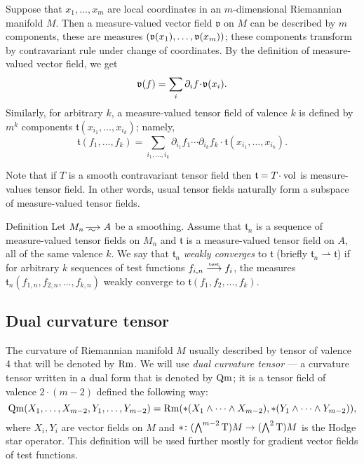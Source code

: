 Suppose that $x_1,\dots,x_m$ are local coordinates in an $m$-dimensional Riemannian manifold $M$.
Then a measure-valued vector field $\mathfrak{v}$ on $M$ can be described by $m$ components, these are measures $(\mathfrak{v}(x_1),\dots,\mathfrak{v}(x_m))$;
these components transform by contravariant rule under change of coordinates.
By the definition of measure-valued vector field, we get
\[\mathfrak{v}(f)=\sum_{i}\partial_i f\cdot \vv(x_i).\]
Similarly, for arbitrary $k$, a measure-valued tensor field of valence $k$ is defined by $m^k$ components 
$\mathfrak{t}(x_{i_1},\dots,x_{i_k})$; namely,
\[\mathfrak{t}(f_1,\dots,f_k)
=
\sum_{i_1,\dots,i_k}
\partial_{i_1} f_1 
\cdots 
\partial_{i_k} f_k
\cdot \mathfrak{t}(x_{i_1},\dots,x_{i_k}).\]

Note that if $T$ is a smooth contravariant tensor field then $\mathfrak{t}=T\cdot \vol$ is measure-values tensor field.
In other words, usual tensor fields naturally form a subspace of measure-valued tensor fields.

\begin{rdef} {Definition}
Let $M_n\smooths{} A$ be a smoothing.
Assume that $\mathfrak{t}_n$ is a sequence of %
 measure-valued tensor fields on $M_n$  and $\mathfrak{t}$ is a
measure-valued tensor field on $A$,
all of the same valence $k$.
We say that $\mathfrak{t}_n$ \emph{weakly converges} to  $\mathfrak{t}$
(briefly $\mathfrak{t}_n\rightharpoonup\mathfrak{t}$) if for arbitrary $k$
sequences of test functions
$f_{i,n}\stackrel{\text{\tiny\rm test}}{\longrightarrow} f_i$, the measures $\mathfrak{t}_n(f_{1,n},f_{2,n},\dots,f_{k,n})$ weakly converge to $\mathfrak{t}(f_{1},f_{2},\dots,f_{k})$.
\end{rdef}

\subsection{Dual curvature tensor}

The curvature of Riemannian manifold $M$ usually described by tensor of valence 4 that will be denoted by $\operatorname{\rm Rm}$.
We will use \emph{dual curvature tensor} --- 
a curvature tensor written in a dual form that is denoted by $\operatorname{\rm Qm}$;
it is a tensor field of valence $2\cdot(m-2)$ defined the following way:
\[
\operatorname{\rm Qm}(X_1,\dots,X_{m-2},Y_1,\dots,Y_{m-2})
= 
\operatorname{\rm Rm}(*(X_1\wedge\dots\wedge X_{m-2}),*(Y_1\wedge\dots\wedge Y_{m-2})),
\]
where $X_i,Y_i$ are vector fields on $M$ and  ${*}\colon(\bigwedge^{m-2}\mathrm{T})M\to(\bigwedge^2\mathrm{T})M$ is the  Hodge star operator.
This definition will be used further mostly for gradient vector fields of test functions.

